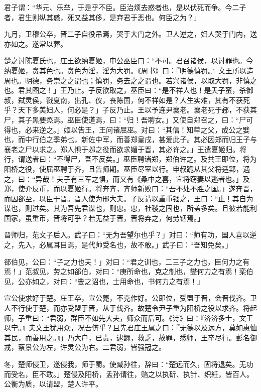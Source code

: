 \documentclass[]{article}
\begin{document}
君子谓：``华元、乐举，于是乎不臣。臣治烦去惑者也，是以伏死而争。今二子者，君生则纵其惑，死又益其侈，是弃君于恶也。何臣之为？」

九月，卫穆公卒，晋二子自役吊焉，哭于大门之外。卫人逆之，妇人哭于门内，送亦如之。遂常以葬。

楚之讨陈夏氏也，庄王欲纳夏姬，申公巫臣曰：``不可。君召诸侯，以讨罪也。今纳夏姬，贪其色也。贪色为淫，淫为大罚。《周书》曰：『明德慎罚。』文王所以造周也。明德，务崇之之谓也；慎罚，务去之之谓也。若兴诸侯，以取大罚，非慎之也。君其图之！」王乃止。子反欲取之，巫臣曰：``是不祥人也！是夭子蛮，杀御叔，弑灵侯，戮夏南，出孔、仪，丧陈国，何不祥如是？人生实难，其有不获死乎？天下多美妇人，何必是？」子反乃止。王以予连尹襄老。襄老死于邲，不获其尸，其子黑要烝焉。巫臣使道焉，曰：``归！吾聘女。」又使自郑召之，曰：``尸可得也，必来逆之。」姬以告王，王问诸屈巫。对曰：``其信！知荦之父，成公之嬖也，而中行伯之季弟也，新佐中军，而善郑皇戌，甚爱此子。其必因郑而归王子与襄老之尸以求之。郑人惧于邲之役而欲求媚于晋，其必许之。」王遣夏姬归。将行，谓送者曰：``不得尸，吾不反矣。」巫臣聘诸郑，郑伯许之。及共王即位，将为阳桥之役，使屈巫聘于齐，且告师期。巫臣尽室以行。申叔跪从其父将适郢，遇之，曰：``异哉！夫子有三军之惧，而又有《桑中之喜，宜将窃妻以逃者也。」及郑，使介反币，而以夏姬行。将奔齐，齐师新败曰：``吾不处不胜之国。」遂奔晋，而因郤至，以臣于晋。晋人使为邢大夫。子反请以重币锢之，王曰：``止！其自为谋也，则过矣。其为吾先君谋也，则忠。忠，社稷之固也，所盖多矣。且彼若能利国家，虽重币，晋将可乎？若无益于晋，晋将弃之，何劳锢焉。」

晋师归，范文子后入。武子曰：``无为吾望尔也乎？」对曰：``师有功，国人喜以逆之，先入，必属耳目焉，是代帅受名也，故不敢。」武子曰：``吾知免矣。」

郤伯见，公曰：``子之力也夫！」对曰：``君之训也，二三子之力也，臣何力之有焉！」范叔见，劳之如郤伯，对曰：``庚所命也，克之制也，燮何力之有焉！栾伯见，公亦如之，对曰：``燮之诏也，士用命也，书何力之有焉！」

宣公使求好于楚。庄王卒，宣公薨，不克作好。公即位，受盟于晋，会晋伐齐。卫人不行使于楚，而亦受盟于晋，从于伐齐。故楚令尹子重为阳桥之役以求齐。将起师，子重曰：``君弱，群臣不如先大夫，师众而后可。《诗》曰：『济济多士，文王以宁。』夫文王犹用众，况吾侪乎？且先君庄王属之曰：『无德以及远方，莫如惠恤其民，而善用之。』」乃大户，已责，逮鳏，救乏，赦罪，悉师，王卒尽行。彭名御戎，蔡景公为左，许灵公为右。二君弱，皆强冠之。

冬，楚师侵卫，遂侵我，师于蜀。使臧孙往，辞曰：``楚远而久，固将退矣。无功而受名，臣不敢。」楚侵及阳桥，孟孙请往，赂之以执斫、执针、织紝，皆百人。公衡为质，以请盟，楚人许平。
\end{document}
